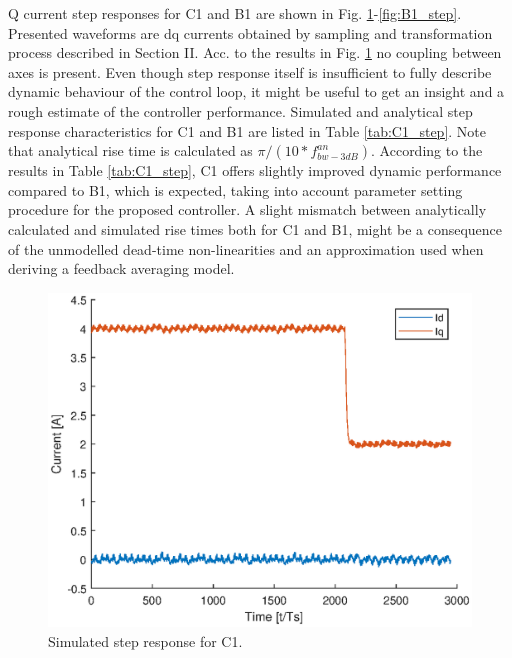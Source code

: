 \documentclass[journal]{IEEEtran}
\begin{document}
Q current step responses for C1 and B1 are shown in Fig. \ref{fig:C1_step}-\ref{fig:B1_step}. Presented waveforms are dq currents obtained by sampling and transformation process described in Section II. Acc. to the results in Fig. \ref{fig:C1_step} no coupling between axes is present. Even though step response itself is insufficient to fully describe dynamic behaviour of the control loop, it might be useful to get an insight and a rough estimate of the controller performance. Simulated and analytical step response characteristics for C1 and B1 are listed in Table \ref{tab:C1_step}. Note that analytical rise time is calculated as $\pi/(10*f_{bw-3dB}^{an})$. According to the results in Table \ref{tab:C1_step}, C1 offers slightly improved dynamic performance compared to B1, which is expected, taking into account parameter setting procedure for the proposed controller. A slight mismatch between analytically calculated and simulated rise times both for C1 and B1, might be a consequence of the unmodelled dead-time non-linearities and an approximation used when deriving a feedback averaging model. \par

\begin{figure}[t!]
    \centerline{\includegraphics[width=0.95\linewidth]{figures/C1_step.eps}}
    \caption{Simulated step response for C1.}
    \label{fig:C1_step} 
\end{figure}
\end{document}
